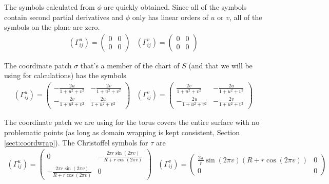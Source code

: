 \documentclass[12pt]{article}
\begin{document}
		The symbols calculated from $\phi$ are quickly obtained.
		Since all of the symbols contain second partial derivatives and $\phi$ only has linear orders of $u$ or $v$, all of the symbols on the plane are zero.
		\begin{equation*}
			\begin{array}{lr}
				\left(\Gamma^{u}_{ij}\right) = \left( \begin{array}{cc}
					0 & 0 \\
					0 & 0
				\end{array} \right) &
				\left(\Gamma^{v}_{ij}\right) = \left( \begin{array}{cc}
					0 & 0 \\
					0 & 0
				\end{array} \right)
			\end{array}
		\end{equation*}
		
		The coordinate patch $\sigma$ that's a member of the chart of $S$ (and that we will be using for calculations) has the symbols
		\begin{equation*}
			\begin{array}{lr}
			\left(\Gamma^{u}_{ij}\right) = \left( \begin{array}{cc}
					-\frac{2u}{1+u^2+v^2} & -\frac{2v}{1+u^2+v^2} \\
					-\frac{2v}{1+u^2+v^2} & \frac{2u}{1+u^2+v^2}
				\end{array} \right) &
			\left(\Gamma^{v}_{ij}\right) = \left( \begin{array}{cc}
					\frac{2v}{1+u^2+v^2} & -\frac{2u}{1+u^2+v^2} \\
					-\frac{2u}{1+u^2+v^2} & -\frac{2v}{1+u^2+v^2}
				\end{array} \right)
			\end{array}
		\end{equation*}
		
		The coordinate patch we are using for the torus covers the entire surface with no problematic points (as long as domain wrapping is kept consistent, Section \ref{sect:coordwrap}).
		The Christoffel symbols for $\tau$ are
		\begin{equation*}
			\begin{array}{lr}
				\left(\Gamma^{u}_{ij}\right) = \left( \begin{array}{cc}
					0 & -\frac{2\pi r\sin(2\pi v)}{R+r\cos(2\pi v)} \\
					-\frac{2\pi r\sin(2\pi v)}{R+r\cos(2\pi v)} & 0
				\end{array} \right) &
				\left(\Gamma^{v}_{ij}\right) = \left( \begin{array}{cc}
					\frac{2\pi}{r}\sin(2\pi v)(R+r\cos(2\pi v)) & 0 \\
					0 & 0
				\end{array} \right)
			\end{array}
		\end{equation*}
		
\end{document}
